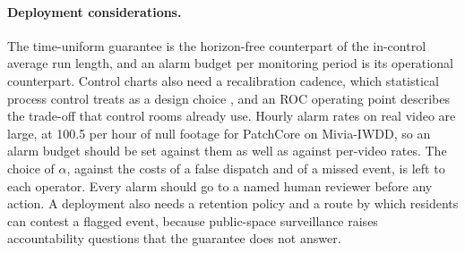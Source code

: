 \paragraph{Deployment considerations.}
The time-uniform guarantee is the horizon-free counterpart of the in-control average run length, and an alarm budget per monitoring period is its operational counterpart. Control charts also need a recalibration cadence, which statistical process control treats as a design choice \citep{montgomery2020introduction}, and an ROC operating point \citep{fawcett2006introduction} describes the trade-off that control rooms already use. Hourly alarm rates on real video are large, at 100.5 per hour of null footage for PatchCore on Mivia-IWDD, so an alarm budget should be set against them as well as against per-video rates. The choice of $\alpha$, against the costs of a false dispatch and of a missed event, is left to each operator. Every alarm should go to a named human reviewer before any action. A deployment also needs a retention policy and a route by which residents can contest a flagged event, because public-space surveillance raises accountability questions that the guarantee does not answer.
